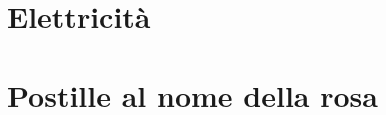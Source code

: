 \documentclass[a4paper, 11pt, twoside, openright, italian]{memoir}
\begin{document}
\frontmatter




\mainmatter

\part{Elettricità}



%
%
%
%
%

\part{Postille al nome della rosa}

%
%
%
%
%
%
\end{document}
